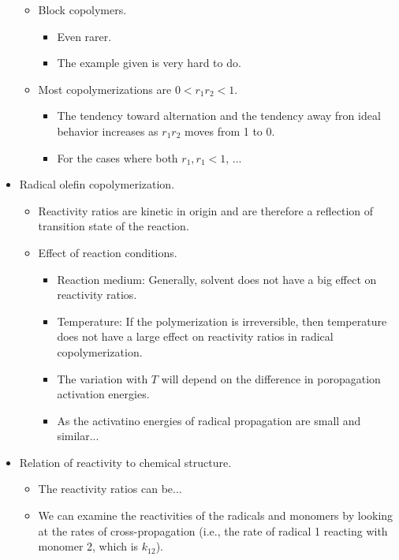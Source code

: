 \documentclass[../notes.tex]{subfiles}
\begin{document}
\begin{itemize}
\begin{itemize}
\begin{itemize}
        \end{itemize}
        \item Block copolymers.
        \begin{itemize}
            \item Even rarer.
            \item The example given is very hard to do.
        \end{itemize}
        \item Most copolymerizations are $0<r_1r_2<1$.
        \begin{itemize}
            \item The tendency toward alternation and the tendency away fron ideal behavior increases as $r_1r_2$ moves from 1 to 0.
            \item For the cases where both $r_1,r_1<1$, ...
        \end{itemize}
    \end{itemize}
    \item Radical olefin copolymerization.
    \begin{itemize}
        \item Reactivity ratios are kinetic in origin and are therefore a reflection of transition state of the reaction.
        \item Effect of reaction conditions.
        \begin{itemize}
            \item Reaction medium: Generally, solvent does not have a big effect on reactivity ratios.
            \item Temperature: If the polymerization is irreversible, then temperature does not have a large effect on reactivity ratios in radical copolymerization.
            \item The variation with $T$ will depend on the difference in poropagation activation energies.
            \item As the activatino energies of radical propagation are small and similar...
        \end{itemize}
    \end{itemize}
    \item Relation of reactivity to chemical structure.
    \begin{itemize}
        \item The reactivity ratios can be...
        \item We can examine the reactivities of the radicals and monomers by looking at the rates of cross-propagation (i.e., the rate of radical 1 reacting with monomer 2, which is $k_{12}$).

\end{itemize}
\end{itemize}
\end{document}
